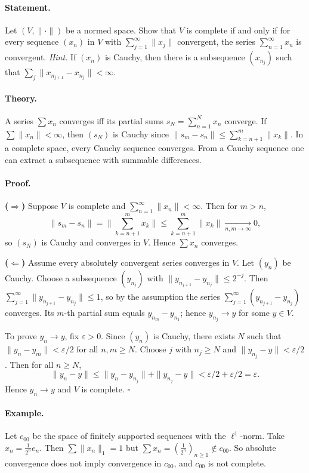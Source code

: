 \documentclass[12pt,a4paper]{article}
\newcommand{\qed}{\hfill$\square$}
\theoremstyle{plain}
\theoremstyle{definition}
\theoremstyle{remark}
\theoremstyle{remark}
\begin{document}
\paragraph{Statement.}
Let $(V,\|\cdot\|)$ be a normed space. Show that $V$ is complete if and only if
for every sequence $(x_n)$ in $V$ with $\sum_{j=1}^\infty \|x_j\|$ convergent,
the series $\sum_{n=1}^\infty x_n$ is convergent.
\emph{Hint.} If $(x_n)$ is Cauchy, then there is a subsequence $(x_{n_j})$
such that $\sum_j \|x_{n_{j+1}}-x_{n_j}\|<\infty$.

\paragraph{Theory.}
A series $\sum x_n$ converges iff its partial sums $s_N=\sum_{n=1}^N x_n$ converge.
If $\sum \|x_n\|<\infty$, then $(s_N)$ is Cauchy since
$\|s_m-s_n\|\le\sum_{k=n+1}^m \|x_k\|$.
In a complete space, every Cauchy sequence converges.
From a Cauchy sequence one can extract a subsequence with summable differences.

\paragraph{Proof.}

\textbf{($\Rightarrow$)} Suppose $V$ is complete and $\sum_{n=1}^\infty \|x_n\|<\infty$.
Then for $m>n$,
\[
\|s_m-s_n\|=\Big\|\sum_{k=n+1}^m x_k\Big\|
\le \sum_{k=n+1}^m \|x_k\|\xrightarrow[n,m\to\infty]{}0,
\]
so $(s_N)$ is Cauchy and converges in $V$. Hence $\sum x_n$ converges.

\textbf{($\Leftarrow$)} Assume every absolutely convergent series converges in $V$.
Let $(y_n)$ be Cauchy. Choose a subsequence $(y_{n_j})$ with
$\|y_{n_{j+1}}-y_{n_j}\|\le 2^{-j}$.
Then $\sum_{j=1}^\infty \|y_{n_{j+1}}-y_{n_j}\|\le 1$, so by the assumption the series
$\sum_{j=1}^\infty (y_{n_{j+1}}-y_{n_j})$ converges.
Its $m$-th partial sum equals $y_{n_m}-y_{n_1}$; hence $y_{n_j}\to y$ for some $y\in V$.

To prove $y_n\to y$, fix $\varepsilon>0$. Since $(y_n)$ is Cauchy, there exists $N$ such that
$\|y_n-y_m\|<\varepsilon/2$ for all $n,m\ge N$.
Choose $j$ with $n_j\ge N$ and $\|y_{n_j}-y\|<\varepsilon/2$.
Then for all $n\ge N$,
\[
\|y_n-y\|\le \|y_n-y_{n_j}\|+\|y_{n_j}-y\|<\varepsilon/2+\varepsilon/2=\varepsilon.
\]
Hence $y_n\to y$ and $V$ is complete.
\qed

\paragraph{Example.}
Let $c_{00}$ be the space of finitely supported sequences with the $\ell^1$-norm.
Take $x_n=\frac{1}{2^n}e_n$. Then $\sum\|x_n\|_1=1$ but
$\sum x_n=(\frac{1}{2^n})_{n\ge1}\notin c_{00}$.
So absolute convergence does not imply convergence in $c_{00}$, and $c_{00}$ is not complete.
\end{document}

